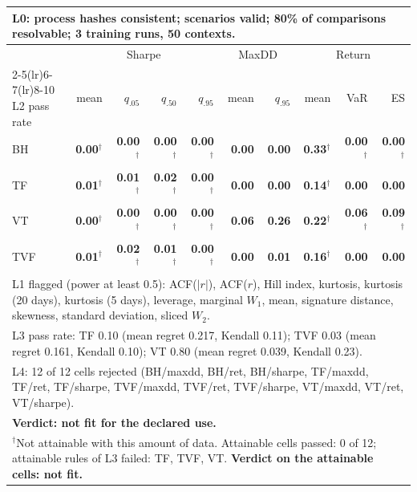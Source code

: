 \begin{tabular}{lrrrrrrrrr}
\toprule
\multicolumn{10}{p{13.5cm}}{L0: process hashes consistent; scenarios valid; 80\% of comparisons resolvable; 3 training runs, 50 contexts.} \\
\midrule
 & \multicolumn{4}{c}{Sharpe} & \multicolumn{2}{c}{MaxDD} & \multicolumn{3}{c}{Return} \\
\cmidrule(lr){2-5}\cmidrule(lr){6-7}\cmidrule(lr){8-10}
L2 pass rate & mean & $q_{.05}$ & $q_{.50}$ & $q_{.95}$ & mean & $q_{.95}$ & mean & VaR & ES \\
\midrule
BH & \textbf{0.00}$^{\dagger}$ & \textbf{0.00}$^{\dagger}$ & \textbf{0.00}$^{\dagger}$ & \textbf{0.00}$^{\dagger}$ & \textbf{0.00} & \textbf{0.00} & \textbf{0.33}$^{\dagger}$ & \textbf{0.00}$^{\dagger}$ & \textbf{0.00}$^{\dagger}$ \\
TF & \textbf{0.01}$^{\dagger}$ & \textbf{0.01}$^{\dagger}$ & \textbf{0.02}$^{\dagger}$ & \textbf{0.00}$^{\dagger}$ & \textbf{0.00} & \textbf{0.00} & \textbf{0.14}$^{\dagger}$ & \textbf{0.00} & \textbf{0.00} \\
VT & \textbf{0.00}$^{\dagger}$ & \textbf{0.00}$^{\dagger}$ & \textbf{0.00}$^{\dagger}$ & \textbf{0.00}$^{\dagger}$ & \textbf{0.06} & \textbf{0.26} & \textbf{0.22}$^{\dagger}$ & \textbf{0.06}$^{\dagger}$ & \textbf{0.09}$^{\dagger}$ \\
TVF & \textbf{0.01}$^{\dagger}$ & \textbf{0.02}$^{\dagger}$ & \textbf{0.01}$^{\dagger}$ & \textbf{0.00}$^{\dagger}$ & \textbf{0.00} & \textbf{0.01} & \textbf{0.16}$^{\dagger}$ & \textbf{0.00} & \textbf{0.00} \\
\midrule
\multicolumn{10}{p{13.5cm}}{L1 flagged (power at least 0.5): ACF($|r|$), ACF($r$), Hill index, kurtosis, kurtosis (20 days), kurtosis (5 days), leverage, marginal $W_1$, mean, signature distance, skewness, standard deviation, sliced $W_2$.} \\
\multicolumn{10}{p{13.5cm}}{L3 pass rate: TF 0.10 (mean regret 0.217, Kendall 0.11); TVF 0.03 (mean regret 0.161, Kendall 0.10); VT 0.80 (mean regret 0.039, Kendall 0.23).} \\
\multicolumn{10}{p{13.5cm}}{L4: 12 of 12 cells rejected (BH/maxdd, BH/ret, BH/sharpe, TF/maxdd, TF/ret, TF/sharpe, TVF/maxdd, TVF/ret, TVF/sharpe, VT/maxdd, VT/ret, VT/sharpe).} \\
\multicolumn{10}{p{13.5cm}}{\textbf{Verdict: not fit for the declared use.}} \\
\multicolumn{10}{p{13.5cm}}{$^{\dagger}$Not attainable with this amount of data. Attainable cells passed: 0 of 12; attainable rules of L3 failed: TF, TVF, VT. \textbf{Verdict on the attainable cells: not fit.}} \\
\bottomrule
\end{tabular}
